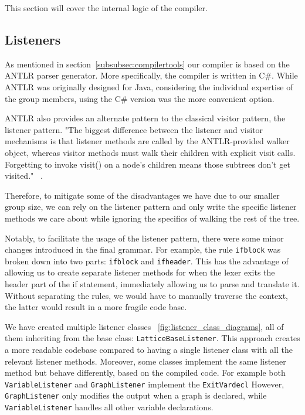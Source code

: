 This section will cover the internal logic of the compiler.

\subsection{Listeners}
As mentioned in section~\ref{subsubsec:compilertools} our compiler is based on the ANTLR parser generator.
More specifically, the compiler is written in C\#.
While ANTLR was originally designed for Java, considering the individual expertise of the group members,
using the C\# version was the more convenient option.

ANTLR also provides an alternate pattern to the classical visitor pattern, the listener pattern.
"The biggest difference between the listener and visitor mechanisms is that
listener methods are called by the ANTLR-provided walker object, whereas
visitor methods must walk their children with explicit visit calls. Forgetting
to invoke visit() on a node’s children means those subtrees don’t get visited." ~\cite{ANTLRReference}.

Therefore, to mitigate some of the disadvantages we have due to our smaller group size, we can rely on the listener pattern
and only write the specific listener methods we care about while ignoring the specifics of walking the rest of the tree.

Notably, to facilitate the usage of the listener pattern, there were some minor changes introduced in the final grammar.
For example, the rule \lstinline{ifblock} was broken down into two parts: \lstinline{ifblock} and \lstinline{ifheader}.
This has the advantage of allowing us to create separate listener methods for when the lexer exits
the header part of the if statement, immediately allowing us to parse and translate it.
Without separating the rules, we would have to manually traverse the context, the latter would result in a
more fragile code base.

We have created multiple listener classes ~\ref{fig:listener_class_diagrams}, all of them inheriting from the base class: \lstinline{LatticeBaseListener}.
This approach creates a more readable codebase compared to having a single listener class with all the relevant
listener methods.
Moreover, some classes implement the same listener method but behave differently, based on the compiled code.
For example both \lstinline{VariableListener} and \lstinline{GraphListener} implement the \lstinline{ExitVardecl}
However, \lstinline{GraphListener} only modifies the output when a graph is declared, while \lstinline{VariableListener}
handles all other variable declarations.

